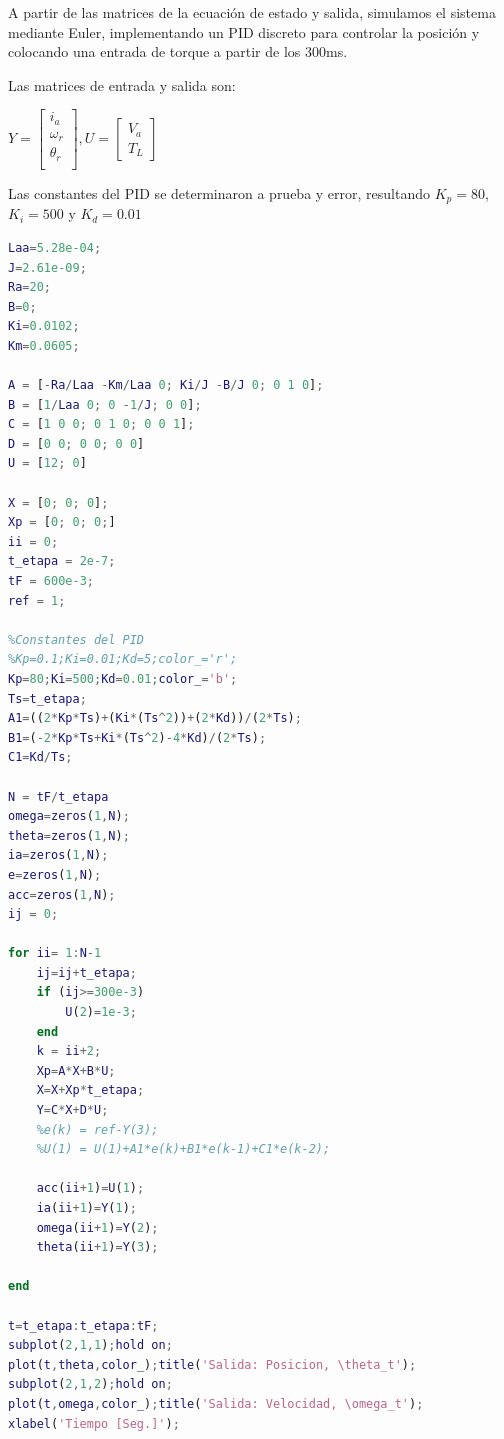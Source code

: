 \documentclass{article}
\begin{document}
A partir de las matrices de la ecuación de estado y salida, simulamos el sistema mediante Euler,
implementando un PID discreto para controlar la posición y colocando una entrada de torque
a partir de los 300ms.

Las matrices de entrada y salida son:

\begin{center}
  \begin{math}
    Y = 
    \begin{bmatrix}
      i_a\\
      \omega_r\\
      \theta_r\\
    \end{bmatrix} 
    , U =
    \begin{bmatrix}
      V_a\\
      T_L
    \end{bmatrix} 
  \end{math}
  \end{center}

Las constantes del PID se determinaron a prueba y error, resultando $K_p = 80$, $K_i=500$ y $K_d = 0.01$

\begin{lstlisting}[language=matlab]
  Laa=5.28e-04;
J=2.61e-09;
Ra=20;
B=0;
Ki=0.0102;
Km=0.0605;

A = [-Ra/Laa -Km/Laa 0; Ki/J -B/J 0; 0 1 0];
B = [1/Laa 0; 0 -1/J; 0 0];
C = [1 0 0; 0 1 0; 0 0 1];
D = [0 0; 0 0; 0 0]
U = [12; 0]

X = [0; 0; 0];
Xp = [0; 0; 0;]
ii = 0;
t_etapa = 2e-7;
tF = 600e-3;
ref = 1;

%Constantes del PID
%Kp=0.1;Ki=0.01;Kd=5;color_='r';
Kp=80;Ki=500;Kd=0.01;color_='b';
Ts=t_etapa;
A1=((2*Kp*Ts)+(Ki*(Ts^2))+(2*Kd))/(2*Ts);
B1=(-2*Kp*Ts+Ki*(Ts^2)-4*Kd)/(2*Ts);
C1=Kd/Ts;

N = tF/t_etapa
omega=zeros(1,N);
theta=zeros(1,N);
ia=zeros(1,N);
e=zeros(1,N);
acc=zeros(1,N);
ij = 0;

for ii= 1:N-1
    ij=ij+t_etapa;
    if (ij>=300e-3)
        U(2)=1e-3;
    end
    k = ii+2;
    Xp=A*X+B*U;
    X=X+Xp*t_etapa;
    Y=C*X+D*U;
    %e(k) = ref-Y(3);
    %U(1) = U(1)+A1*e(k)+B1*e(k-1)+C1*e(k-2);
    
    acc(ii+1)=U(1);
    ia(ii+1)=Y(1);
    omega(ii+1)=Y(2);
    theta(ii+1)=Y(3);
    
end

t=t_etapa:t_etapa:tF;
subplot(2,1,1);hold on;
plot(t,theta,color_);title('Salida: Posicion, \theta_t');
subplot(2,1,2);hold on;
plot(t,omega,color_);title('Salida: Velocidad, \omega_t');
xlabel('Tiempo [Seg.]');
\end{lstlisting}
\end{document}
